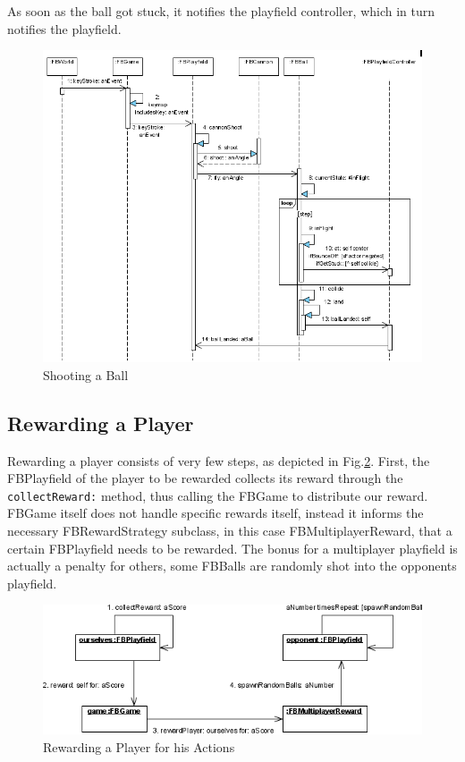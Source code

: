 As soon as the ball got stuck, it notifies the playfield controller, which in turn notifies
the playfield.
%
\begin{figure}[bt]
  \begin{center}
    \includegraphics[width=\linewidth]{images/ShootingABall.png}
  \end{center}
  \caption{Shooting a Ball}
  \label{fig:ShootingABall}
\end{figure}
%
\subsection{Rewarding a Player}
Rewarding a player consists of very few steps, as depicted in Fig.\ref{fig:RewardingAPlayer}. 
First, the FBPlayfield of the player to be rewarded collects its reward 
through the \\{\lstinline!collectReward:!} method, thus calling the FBGame 
to distribute our reward. FBGame itself does not handle specific rewards 
itself, instead it informs the necessary FBRewardStrategy subclass, in 
this case FBMultiplayerReward, that a certain FBPlayfield needs to be 
rewarded. The bonus for a multiplayer playfield is actually a penalty 
for others, some FBBalls are randomly shot into the opponents playfield.

%
\begin{figure}[bt]
  \begin{center}
    \includegraphics[width=\linewidth]{images/RewardingAPlayer.png}
  \end{center}
  \caption{Rewarding a Player for his Actions}
  \label{fig:RewardingAPlayer}
\end{figure}
%